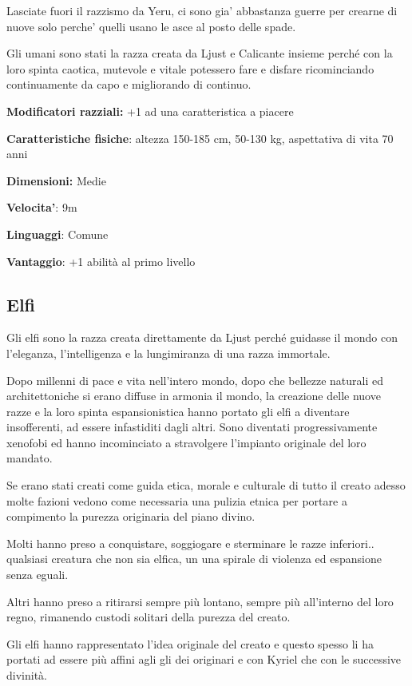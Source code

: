\documentclass[a4paper,11pt,twoside,openany]{book}
\begin{document}
Lasciate fuori il razzismo da Yeru, ci sono gia' abbastanza guerre per crearne di nuove solo perche' quelli usano le asce al posto delle spade.

Gli umani sono stati la razza creata da Ljust e Calicante insieme perché con la loro spinta caotica, mutevole e vitale potessero fare e disfare ricominciando continuamente da capo e migliorando di continuo.

\textbf{Modificatori razziali:} +1 ad una caratteristica a piacere

\textbf{Caratteristiche fisiche}: altezza 150-185 cm, 50-130 kg, aspettativa di vita 70 anni

\textbf{Dimensioni:} Medie

\textbf{Velocita'}: 9m

\textbf{Linguaggi}: Comune

\textbf{Vantaggio}: +1 abilità al primo livello

\subsection{Elfi}

\label{elfi}

Gli elfi sono la razza creata direttamente da Ljust perché guidasse il mondo con l'eleganza, l'intelligenza e la lungimiranza di una razza immortale.

Dopo millenni di pace e vita nell'intero mondo, dopo che bellezze naturali ed architettoniche si erano diffuse in armonia il mondo, la creazione delle nuove razze e la loro spinta espansionistica hanno portato gli elfi a diventare insofferenti, ad essere infastiditi dagli altri.
Sono diventati progressivamente xenofobi ed hanno incominciato a stravolgere l'impianto originale del loro mandato.

Se erano stati creati come guida etica, morale e culturale di tutto il creato adesso molte fazioni vedono come necessaria una pulizia etnica per portare a compimento la purezza originaria del piano divino.

Molti hanno preso a conquistare, soggiogare e sterminare le razze inferiori.. qualsiasi creatura che non sia elfica, un una spirale di violenza ed espansione senza eguali.

Altri hanno preso a ritirarsi sempre più lontano, sempre più all'interno del loro regno, rimanendo custodi solitari della purezza del creato.

Gli elfi hanno rappresentato l'idea originale del creato e questo spesso li ha portati ad essere più affini agli gli dei originari e con Kyriel che con le successive divinità.
\end{document}

